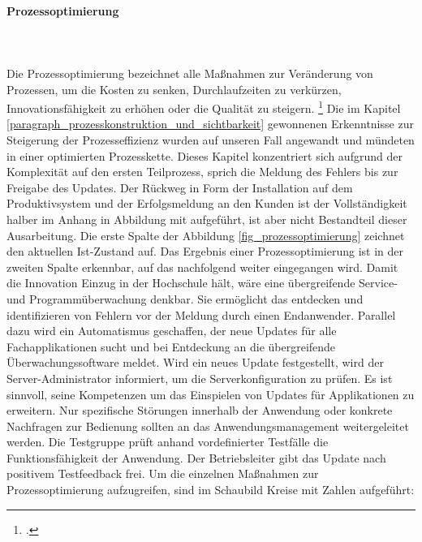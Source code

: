 \paragraph{Prozessoptimierung}\mbox{}\\\\
\label{paragraph_prozessoptimierung}
Die Prozessoptimierung bezeichnet alle Maßnahmen zur Veränderung von Prozessen, um die Kosten zu senken, Durchlaufzeiten zu verkürzen, Innovationsfähigkeit zu erhöhen oder die Qualität zu steigern. \footcite[Vgl.][280]{heinrich_stelzer_2011}
Die im Kapitel \ref{paragraph_prozesskonstruktion_und_sichtbarkeit} gewonnenen Erkenntnisse zur Steigerung der Prozesseffizienz wurden auf unseren Fall angewandt und mündeten in einer optimierten Prozesskette. Dieses Kapitel konzentriert sich aufgrund der Komplexität auf den ersten Teilprozess, sprich die Meldung des Fehlers bis zur Freigabe des Updates. Der Rückweg in Form der Installation auf dem Produktivsystem und der Erfolgsmeldung an den Kunden ist der Vollständigkeit halber im Anhang in Abbildung \glqq{}\grqq{} mit aufgeführt, ist aber nicht Bestandteil dieser Ausarbeitung.
Die erste Spalte der Abbildung \ref{fig_prozessoptimierung} zeichnet den aktuellen Ist-Zustand auf. Das Ergebnis einer Prozessoptimierung ist in der zweiten Spalte erkennbar, auf das nachfolgend weiter eingegangen wird. Damit die Innovation Einzug in der Hochschule hält, wäre eine übergreifende Service- und Programmüberwachung denkbar. Sie ermöglicht das entdecken und identifizieren von Fehlern vor der Meldung durch einen Endanwender. Parallel dazu wird ein Automatismus geschaffen, der neue Updates für alle Fachapplikationen sucht und bei Entdeckung an die übergreifende Überwachungssoftware meldet. Wird ein neues Update festgestellt, wird der Server-Administrator informiert, um die Serverkonfiguration zu prüfen. Es ist sinnvoll, seine Kompetenzen um das Einspielen von Updates für Applikationen zu erweitern. Nur spezifische Störungen innerhalb der Anwendung oder konkrete Nachfragen zur Bedienung sollten an das Anwendungsmanagement weitergeleitet werden.  Die Testgruppe prüft anhand vordefinierter Testfälle die Funktionsfähigkeit der Anwendung. Der Betriebsleiter gibt das Update nach positivem Testfeedback frei.
Um die einzelnen Maßnahmen zur Prozessoptimierung aufzugreifen, sind im Schaubild Kreise mit Zahlen aufgeführt:

